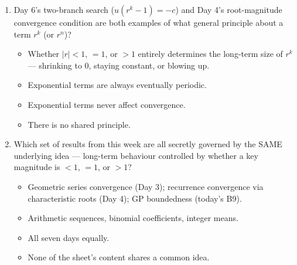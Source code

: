 \documentclass[11pt,a4paper]{article}
\begin{document}
\begin{enumerate}
\item Day 6's two-branch search ($u(r^k-1)=-c$) and Day 4's root-magnitude convergence condition are both examples of what general principle about a term $r^k$ (or $r^n$)?
\begin{itemize}
\item[A)] Whether $|r|<1$, $=1$, or $>1$ entirely determines the long-term size of $r^k$ --- shrinking to $0$, staying constant, or blowing up.
\item[B)] Exponential terms are always eventually periodic.
\item[C)] Exponential terms never affect convergence.
\item[D)] There is no shared principle.
\end{itemize}


\item Which set of results from this week are all secretly governed by the SAME underlying idea --- long-term behaviour controlled by whether a key magnitude is $<1$, $=1$, or $>1$?
\begin{itemize}
\item[A)] Geometric series convergence (Day 3); recurrence convergence via characteristic roots (Day 4); GP boundedness (today's B9).
\item[B)] Arithmetic sequences, binomial coefficients, integer means.
\item[C)] All seven days equally.
\item[D)] None of the sheet's content shares a common idea.
\end{itemize}


\end{enumerate}
\end{document}
